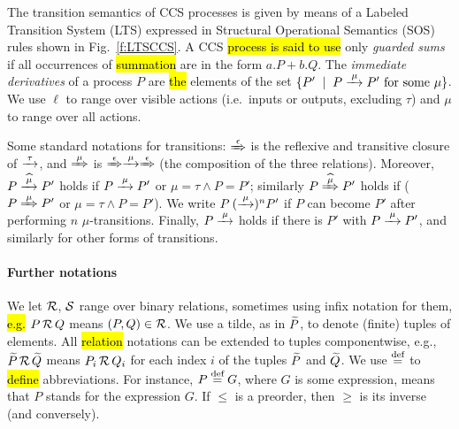 The transition semantics of CCS processes is given by means of
a Labeled Transition System (LTS) expressed in Structural Operational
Semantics (SOS) rules shown in Fig.~\ref{f:LTSCCS}.
A CCS \hl{process is said to use} only \emph{guarded sums} if all occurrences of
\hl{summation} are in the form $a.P + b.Q$.
The \emph{immediate derivatives} of a
process $P$ are \hl{the} elements of the set $\{P' \st P \arr\mu P'
\mbox{ for some $\mu$}\}$.
We use $\ell$ to range over visible actions (i.e.~inputs or outputs, excluding $\tau$)
and $\mu$ to range over all actions.

Some standard notations for transitions: $\Arr\epsilon$ is the 
reflexive and transitive closure of $\arr\tau$, and 
$\Arr \mu $ is $\Arr\epsilon \arr\mu \Arr\epsilon$ (the
composition of the three relations).
Moreover,   
$P \arcap \mu P'$ holds if $P \arr\mu P'$ or $\mu =\tau \wedge P = P'$; similarly 
$P \Arcap \mu P'$ holds if ($P \Arr\mu P'$ or $\mu =\tau \wedge P = P'$).
We write $P \:(\arr\mu)^n P'$ if $P$ can become $P'$ after performing
$n$ $\mu$-transitions. Finally, $P \arr\mu$ holds if there is $P'$
with $P \arr\mu P'$, and similarly for other forms of transitions.

\paragraph{Further notations}
We let $\R$, $\S$ range over binary relations, sometimes using 
 infix notation for them, \hl{e.g.} $P \,\R\, Q$ means $(P,Q) \in \R$.
We use a tilde, as in  $\til P$, to denote (finite) tuples of elements. 
All \hl{relation} notations can be extended to tuples componentwise,
e.g., $\til P \,\R\, \til Q$ means $P_i \,\R\, Q_i$ for each index $i$ of the tuples $\til P$ and $\til Q$.
We use $\DSdefi$ to \hl{define} abbreviations. For instance, $P \DSdefi G $, where
$G$ is some expression, means that $P$ stands for the expression $G$.
If $\leq$ is a preorder, then  $\geq$  is its inverse (and
conversely).


